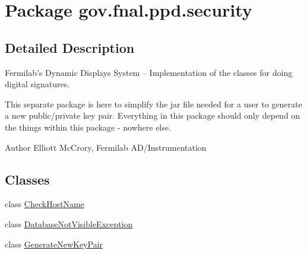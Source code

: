 \hypertarget{namespacegov_1_1fnal_1_1ppd_1_1security}{\section{Package gov.\-fnal.\-ppd.\-security}
\label{namespacegov_1_1fnal_1_1ppd_1_1security}
}


\subsection{Detailed Description}
Fermilab's Dynamic Displays System -- Implementation of the classes for doing digital signatures. 

This separate package is here to simplify the jar file needed for a user to generate a new public/private key pair. Everything in this package should only depend on the things within this package -\/ nowhere else. 

\begin{DoxyAuthor}{Author}
Elliott Mc\-Crory, Fermilab A\-D/\-Instrumentation 
\end{DoxyAuthor}
\subsection*{Classes}
\begin{DoxyCompactItemize}
\item 
class \hyperlink{classgov_1_1fnal_1_1ppd_1_1security_1_1CheckHostName}{Check\-Host\-Name}
\item 
class \hyperlink{classgov_1_1fnal_1_1ppd_1_1security_1_1DatabaseNotVisibleException}{Database\-Not\-Visible\-Exception}
\item 
class \hyperlink{classgov_1_1fnal_1_1ppd_1_1security_1_1GenerateNewKeyPair}{Generate\-New\-Key\-Pair}
\end{DoxyCompactItemize}
